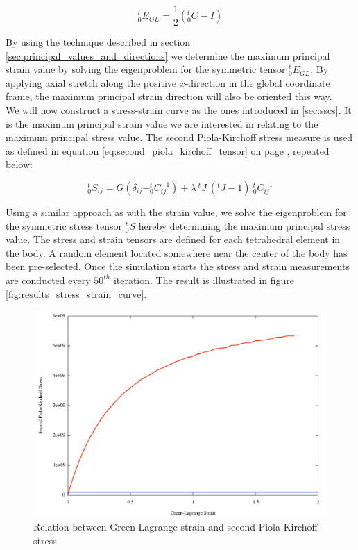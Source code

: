 \begin{equation*}
^t_0E_{GL} = \frac{1}{2}(^t_0C - I)
\end{equation*}

By using the technique described in section
\vref{sec:principal_values_and_directions} we determine the maximum
principal strain value by solving the eigenproblem for the symmetric
tensor $^t_0E_{GL}$. By applying axial stretch along the positive
$x$-direction in the global coordinate frame, the maximum principal
strain direction will also be oriented this way. \\

We will now construct a stress-strain curve as the ones introduced in
\vref{sec:sscs}.
It is the maximum principal strain value we are interested in relating
to the maximum principal stress value. The second Piola-Kirchoff
stress measure is used as defined in 
equation \eqref{eq:second_piola_kirchoff_tensor} on page
\pageref{eq:second_piola_kirchoff_tensor}, repeated below:

\begin{equation*}
^t_0S_{ij} = G(\delta_{ij} - ^t_0C_{ij}^{-1}) + \lambda \ ^tJ \ (^tJ-1) \ ^t_0C_{ij}^{-1}
\end{equation*}

Using a similar approach as with the strain value, we solve the
eigenproblem for the symmetric stress tensor $^t_0S$ hereby
determining the maximum principal stress value. The stress and strain
tensors are defined for each tetrahedral element in the body. A random
element located somewhere near the center of the body has been pre-selected.
Once the simulation starts the stress and strain measurements are
conducted every $50^{th}$ iteration. The result is illustrated in
figure \vref{fig:results_stress_strain_curve}.

\begin{figure}
    \centering
    \includegraphics[width=140mm]{./images/results_ssc_dentine_large.pdf}
    \caption{Relation between Green-Lagrange strain and second
      Piola-Kirchoff stress.}
\label{fig:results_stress_strain_curve}
\end{figure}

